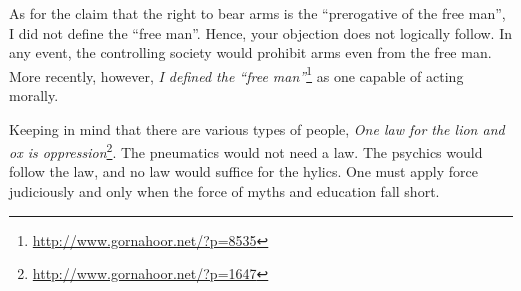 \begin{footnotesize}
\begin{sffamily}
As for the claim that the right to bear arms is the ``prerogative of the free man'', I did not define the ``free man''. Hence, your objection does not logically follow. In any event, the controlling society would prohibit arms even from the free man. More recently, however, \textit{I defined the ``free man''}\footnote{\url{http://www.gornahoor.net/?p=8535}} as one capable of acting morally.

Keeping in mind that there are various types of people, \textit{One law for the lion and ox is oppression}\footnote{\url{http://www.gornahoor.net/?p=1647}}. The pneumatics would not need a law. The psychics would follow the law, and no law would suffice for the hylics. One must apply force judiciously and only when the force of myths and education fall short.

\hfill

\end{sffamily}
\end{footnotesize}

